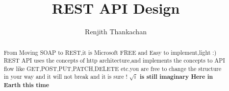 \documentclass[]{article}
\begin{document}
\title{REST API Design}
\author{Renjith Thankachan}
\maketitle

\begin{abstract}
From Moving SOAP to REST,it is Microsoft FREE and Easy to implement,light :)
REST API uses the concepts of http architecture,and implements the concepts to API flow like GET,POST,PUT,PATCH,DELETE etc.you are free to change the structure in your way and it will not break and it is sure !
\textbf{$\sqrt{i}$ is still imaginary Here in Earth this time}
\end{abstract}
\end{document}
